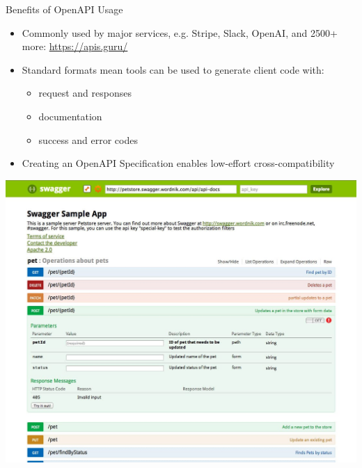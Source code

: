 \documentclass[bigger]{beamer}
\begin{document}
\begin{frame}[label={sec:org3880b89}]{Benefits of OpenAPI Usage}
\begin{itemize}
\item Commonly used by major services, e.g. Stripe, Slack, OpenAI, and 2500+ more: \url{https://apis.guru/}
\item Standard formats mean tools can be used to generate client code with:
\begin{itemize}
\item request and responses
\item documentation
\item success and error codes
\end{itemize}
\item Creating an OpenAPI Specification enables low-effort cross-compatibility
\end{itemize}
\end{frame}

\begin{frame}[label={sec:org9c0fb32}]{}
\begin{center}
\includegraphics[width=1.2\linewidth]{swagger-ui.jpg}
\end{center}
\end{frame}
\end{document}
